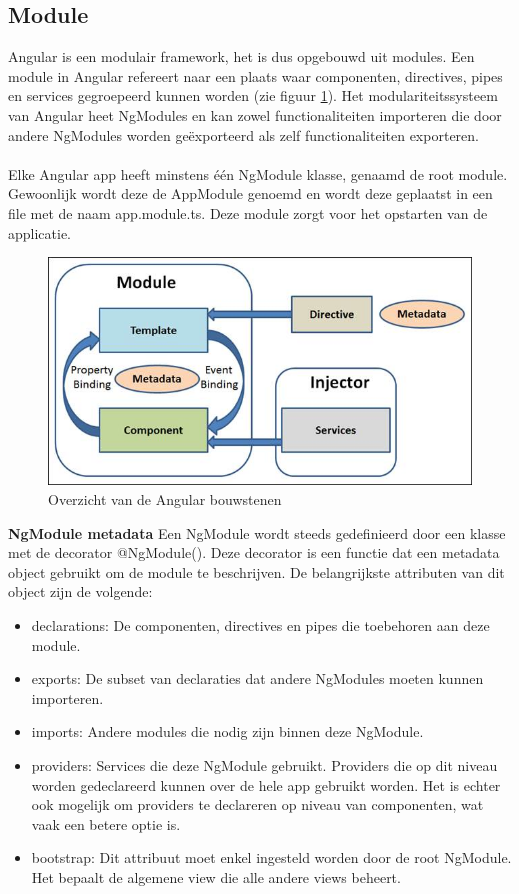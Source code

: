 \subsection{Module}
Angular is een modulair framework, het is dus opgebouwd uit modules. Een module in Angular refereert naar een plaats waar componenten, directives, pipes en services gegroepeerd kunnen worden (zie figuur \ref{fig:Angular-Module-Component}). 
Het modulariteitssysteem van Angular heet NgModules en kan zowel functionaliteiten importeren die door andere NgModules worden geëxporteerd als zelf functionaliteiten exporteren. 
\\ \\
Elke Angular app heeft minstens één NgModule klasse, genaamd de root module. Gewoonlijk wordt deze de AppModule genoemd en wordt deze geplaatst in een file met de naam app.module.ts. Deze module zorgt voor het opstarten van de applicatie. 

\begin{figure}[H]
	\centering
	\includegraphics[width=0.6\linewidth]{Angular-Module-Component}
	\caption{Overzicht van de Angular bouwstenen \autocite{Trivedi2016}}
	\label{fig:Angular-Module-Component}
\end{figure}

\textbf{NgModule metadata} \hspace{1cm} Een NgModule wordt steeds gedefinieerd door een klasse met de decorator @NgModule(). Deze decorator is een functie dat een metadata object gebruikt om de module te beschrijven. De belangrijkste attributen van dit object zijn de volgende: 
\begin{itemize}
	\item declarations: De componenten, directives en pipes die toebehoren aan deze module.  
	\item exports: De subset van declaraties dat andere NgModules moeten kunnen importeren. 
	\item imports: Andere modules die nodig zijn binnen deze NgModule. 
	\item providers: Services die deze NgModule gebruikt. Providers die op dit niveau worden gedeclareerd kunnen over de hele app gebruikt worden. Het is echter ook mogelijk om providers te declareren op niveau van componenten, wat vaak een betere optie is.
	\item bootstrap: Dit attribuut moet enkel ingesteld worden door de root NgModule. Het bepaalt de algemene view die alle andere views beheert.
\end{itemize}

